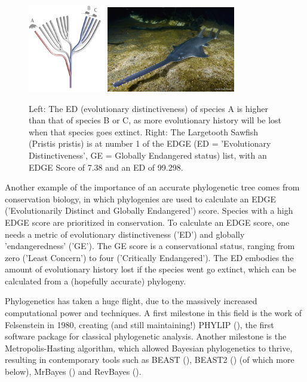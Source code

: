 \begin{figure}[H]
  \includegraphics[width=0.3\textwidth]{edge_tree.png}
  \includegraphics[width=0.5\textwidth]{Pristis-pristis_Simon-Fraser-University-1000x667.jpg}
  \caption{
    Left: The ED (evolutionary distinctiveness)       
    of species A is higher than that of species 
    B or C, as more                             
    evolutionary history will be lost when      
    that species goes extinct.
    Right: The Largetooth Sawfish (Pristis pristis) is at number 1 of the 
    EDGE (ED = 'Evolutionary Distinctiveness', GE = Globally Endangered status) 
    list, with an EDGE Score of 7.38 and an ED of 99.298.
 }
  \label{fig:edge_species}
\end{figure}

Another example of the importance of an accurate phylogenetic tree 
comes from conservation biology, in which phylogenies are used to
calculate an EDGE ('Evolutionarily Distinct and Globally Endangered') 
score. Species with a high EDGE score are prioritized in conservation.
To calculate an EDGE score, one needs a metric of evolutionary 
distinctiveness ('ED') and globally 'endangeredness' ('GE').
The GE score is a conservational status, ranging from zero ('Least Concern') 
to four ('Critically Endangered'). 
The ED embodies the amount of evolutionary history lost if the species 
went go extinct, which can be calculated from a (hopefully accurate) 
phylogeny.

Phylogenetics has taken a huge flight, due to the massively increased
computational power and techniques. A first milestone in this field is 
the work of Felsenstein in 1980, creating (and still maintaining!) 
PHYLIP (\cite{felsenstein1981evolutionary}), 
the first software package for classical phylogenetic analysis.
Another milestone is the Metropolis-Hasting algorithm, which 
allowed Bayesian phylogenetics to thrive, resulting in
contemporary tools such as BEAST (\cite{beast1}), BEAST2 (\cite{beast2}) (of which more below), 
MrBayes (\cite{mrbayes}) and RevBayes (\cite{revbayes}).


